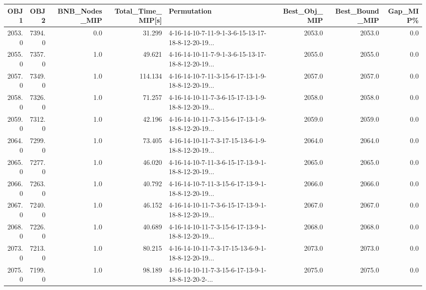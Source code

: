 \begin{tabular}{rrrrlrrr}
\toprule
   OBJ1 &    OBJ2 &  BNB\_Nodes\_MIP &  Total\_Time\_MIP[s] &                                        Permutation &  Best\_Obj\_MIP &  Best\_Bound\_MIP &  Gap\_MIP\% \\
\midrule
 2053.0 &  7394.0 &            0.0 &             31.299 &  4-16-14-10-7-11-9-1-3-6-15-13-17-18-8-12-20-19... &        2053.0 &          2053.0 &       0.0 \\
 2055.0 &  7357.0 &            1.0 &             49.621 &  4-16-14-10-11-7-9-1-3-6-15-13-17-18-8-12-20-19... &        2055.0 &          2055.0 &       0.0 \\
 2057.0 &  7349.0 &            1.0 &            114.134 &  4-16-14-10-7-11-3-15-6-17-13-1-9-18-8-12-20-19... &        2057.0 &          2057.0 &       0.0 \\
 2058.0 &  7326.0 &            1.0 &             71.257 &  4-16-14-10-11-7-3-6-15-17-13-1-9-18-8-12-20-19... &        2058.0 &          2058.0 &       0.0 \\
 2059.0 &  7312.0 &            1.0 &             42.196 &  4-16-14-10-11-7-3-15-6-17-13-1-9-18-8-12-20-19... &        2059.0 &          2059.0 &       0.0 \\
 2064.0 &  7299.0 &            1.0 &             73.405 &  4-16-14-10-11-7-3-17-15-13-6-1-9-18-8-12-20-19... &        2064.0 &          2064.0 &       0.0 \\
 2065.0 &  7277.0 &            1.0 &             46.020 &  4-16-14-10-7-11-3-6-15-17-13-9-1-18-8-12-20-19... &        2065.0 &          2065.0 &       0.0 \\
 2066.0 &  7263.0 &            1.0 &             40.792 &  4-16-14-10-7-11-3-15-6-17-13-9-1-18-8-12-20-19... &        2066.0 &          2066.0 &       0.0 \\
 2067.0 &  7240.0 &            1.0 &             46.152 &  4-16-14-10-11-7-3-6-15-17-13-9-1-18-8-12-20-19... &        2067.0 &          2067.0 &       0.0 \\
 2068.0 &  7226.0 &            1.0 &             40.689 &  4-16-14-10-11-7-3-15-6-17-13-9-1-18-8-12-20-19... &        2068.0 &          2068.0 &       0.0 \\
 2073.0 &  7213.0 &            1.0 &             80.215 &  4-16-14-10-11-7-3-17-15-13-6-9-1-18-8-12-20-19... &        2073.0 &          2073.0 &       0.0 \\
 2075.0 &  7199.0 &            1.0 &             98.189 &  4-16-14-10-11-7-3-15-6-17-13-9-1-18-8-12-20-2-... &        2075.0 &          2075.0 &       0.0 \\

\end{tabular}
